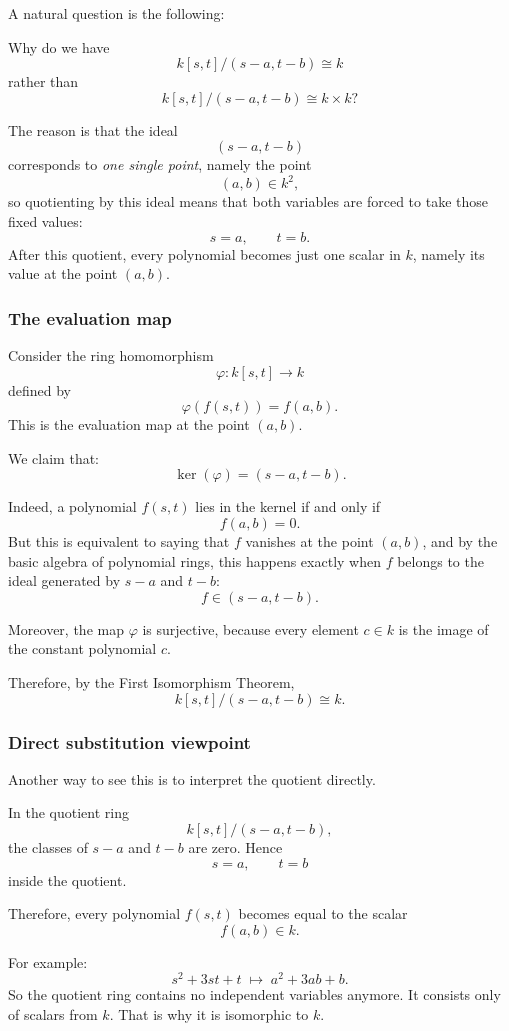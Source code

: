 \documentclass[12pt,a4paper]{article}
\theoremstyle{notespace}
\theoremstyle{definition}
\begin{document}
A natural question is the following:

\medskip

Why do we have
\[
k[s,t]/(s-a,t-b)\cong k
\]
rather than
\[
k[s,t]/(s-a,t-b)\cong k\times k?
\]

\medskip

The reason is that the ideal
\[
(s-a,t-b)
\]
corresponds to \emph{one single point}, namely the point
\[
(a,b)\in k^2,
\]
so quotienting by this ideal means that both variables are forced to take those fixed values:
\[
s=a,\qquad t=b.
\]
After this quotient, every polynomial becomes just one scalar in \(k\), namely its value at the point \((a,b)\).

\subsubsection{The evaluation map}

Consider the ring homomorphism
\[
\varphi:k[s,t]\longrightarrow k
\]
defined by
\[
\varphi(f(s,t))=f(a,b).
\]
This is the evaluation map at the point \((a,b)\).

We claim that:
\[
\ker(\varphi)=(s-a,t-b).
\]

Indeed, a polynomial \(f(s,t)\) lies in the kernel if and only if
\[
f(a,b)=0.
\]
But this is equivalent to saying that \(f\) vanishes at the point \((a,b)\), and by the basic algebra of polynomial rings, this happens exactly when \(f\) belongs to the ideal generated by \(s-a\) and \(t-b\):
\[
f\in (s-a,t-b).
\]

Moreover, the map \(\varphi\) is surjective, because every element \(c\in k\) is the image of the constant polynomial \(c\).

Therefore, by the First Isomorphism Theorem,
\[
k[s,t]/(s-a,t-b)\cong k.
\]

\subsubsection{Direct substitution viewpoint}

Another way to see this is to interpret the quotient directly.

In the quotient ring
\[
k[s,t]/(s-a,t-b),
\]
the classes of \(s-a\) and \(t-b\) are zero. Hence
\[
s=a,\qquad t=b
\]
inside the quotient.

Therefore, every polynomial \(f(s,t)\) becomes equal to the scalar
\[
f(a,b)\in k.
\]

For example:
\[
s^2+3st+t \;\mapsto\; a^2+3ab+b.
\]
So the quotient ring contains no independent variables anymore. It consists only of scalars from \(k\). That is why it is isomorphic to \(k\).
\end{document}

